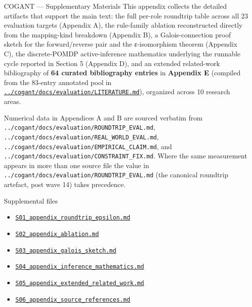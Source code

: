 \documentclass[
  ignorenonframetext,
]{beamer}
\author{\texorpdfstring{}{}}
\date{}
\providecommand{\tightlist}{%
  \setlength{\itemsep}{0pt}\setlength{\parskip}{0pt}}
\begin{document}
\begin{frame}[fragile]{COGANT --- Supplementary Materials}
\protect{}\label{cogant-supplementary-materials}
This appendix collects the detailed artifacts that support the main
text: the full per-role roundtrip table across all 23 evaluation targets
(Appendix A), the rule-family ablation reconstructed directly from the
mapping-kind breakdown (Appendix B), a Galois-connection proof sketch
for the forward/reverse pair and the ε-isomorphism theorem (Appendix C),
the discrete-POMDP active-inference mathematics underlying the runnable
cycle reported in Section 5 (Appendix D), and an extended related-work
bibliography of \textbf{64 curated bibliography entries} in
\textbf{Appendix E} (compiled from the 83-entry annotated pool in
\href{../cogant/docs/evaluation/LITERATURE.md}{\texttt{../cogant/docs/evaluation/LITERATURE.md}}),
organized across 10 research areas.

Numerical data in Appendices A and B are sourced verbatim from
\texttt{../cogant/docs/evaluation/ROUNDTRIP\_EVAL.md},
\texttt{../cogant/docs/evaluation/REAL\_WORLD\_EVAL.md},
\texttt{../cogant/docs/evaluation/EMPIRICAL\_CLAIM.md}, and
\texttt{../cogant/docs/evaluation/CONSTRAINT\_FIX.md}. Where the same
measurement appears in more than one source file the value in
\texttt{../cogant/docs/evaluation/ROUNDTRIP\_EVAL.md} (the canonical
roundtrip artefact, post wave 14) takes precedence.
\end{frame}

\begin{frame}[fragile]
\begin{block}{Supplemental files}
\protect{}\label{supplemental-files}
\begin{itemize}
\tightlist
\item
  \href{S01_appendix_roundtrip_epsilon.md}{\texttt{S01\_appendix\_roundtrip\_epsilon.md}}
\item
  \href{S02_appendix_ablation.md}{\texttt{S02\_appendix\_ablation.md}}
\item
  \href{S03_appendix_galois_sketch.md}{\texttt{S03\_appendix\_galois\_sketch.md}}
\item
  \href{S04_appendix_inference_mathematics.md}{\texttt{S04\_appendix\_inference\_mathematics.md}}
\item
  \href{S05_appendix_extended_related_work.md}{\texttt{S05\_appendix\_extended\_related\_work.md}}
\item
  \href{S06_appendix_source_references.md}{\texttt{S06\_appendix\_source\_references.md}}
\end{itemize}
\end{block}
\end{frame}
\end{document}
